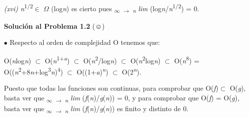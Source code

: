 \documentclass[12pt]{article}
\renewcommand{\_}{\kern-1.5pt\textunderscore\kern-1.5pt}
\begin{document}
\begin{adjustwidth}{0.58in}{2.2in}
{\fontsize{10pt}{12.0pt}\selectfont \textit{(xvi) n}\textsuperscript{1/2}$ \in $ $ \Omega $ (log\textit{n}) es cierto pues \textsubscript{$\infty$ $ \rightarrow $ \textit{n }}\textit{lim }(log\textit{n}/\textit{n}\textsuperscript{1/2}) = 0. \par}\par

\end{adjustwidth}


\vspace{\baselineskip}
\begin{adjustwidth}{0.58in}{0.57in}
{\fontsize{10pt}{12.0pt}\selectfont \textbf{Solución al Problema 1.2 }(☺) \par}\par

\end{adjustwidth}

\begin{adjustwidth}{0.58in}{2.42in}
{\fontsize{10pt}{12.0pt}\selectfont $\bullet$  Respecto al orden de complejidad O tenemos que: \par}\par

\end{adjustwidth}

\begin{adjustwidth}{0.91in}{0.71in}
\begin{Center}
{\fontsize{10pt}{12.0pt}\selectfont O(\textit{n}log\textit{n}) $ \subset $  O(\textit{n}\textsuperscript{1+\textit{a}}) $ \subset $  O(\textit{n}\textsuperscript{2}/log\textit{n}) $ \subset $  O(\textit{n}\textsuperscript{2}log\textit{n}) $ \subset $  O(\textit{n}\textsuperscript{8}) = O((\textit{n}\textsuperscript{2}+8\textit{n}+log\textsuperscript{3}\textit{n})\textsuperscript{4}) $ \subset $  O((1+\textit{a})\textit{\textsuperscript{n}}) $ \subset $  O(2\textit{\textsuperscript{n}}). \par}
\end{Center}\par

\end{adjustwidth}

\begin{adjustwidth}{0.77in}{0.57in}
\begin{justify}
{\fontsize{10pt}{12.0pt}\selectfont Puesto que todas las funciones son continuas, para comprobar que O(\textit{f})$ \subset $ O(\textit{g}), basta ver que \textsubscript{$\infty$ $ \rightarrow $ \textit{n }}\textit{lim }(\textit{f}(\textit{n})/\textit{g}(\textit{n})) = 0, y para comprobar que O(\textit{f}) = O(\textit{g}), basta ver que \textsubscript{$\infty$ $ \rightarrow $ \textit{n }}\textit{lim }(\textit{f}(\textit{n})/\textit{g}(\textit{n})) es finito y distinto de 0. \par}
\end{justify}\par

\end{adjustwidth}
\end{document}
